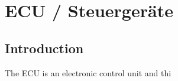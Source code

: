 \section{ECU / Steuergeräte}
    \subsection{Introduction}
    The ECU is an electronic control unit and thi